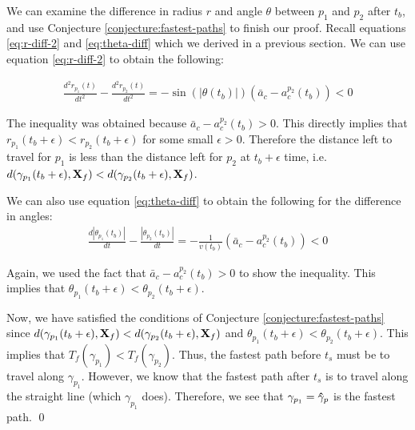 We can examine the difference in radius $r$ and angle $\theta$ between $p_1$ and $p_2$ after $t_b$, and use Conjecture \ref{conjecture:fastest-paths} to finish our proof. Recall equations \ref{eq:r-diff-2} and \ref{eq:theta-diff} which we derived in a previous section. We can use equation \ref{eq:r-diff-2} to obtain the following:

\begin{eqnarray}
  \frac{d^2 r_{p_1}(t)}{d t^2} - \frac{d^2 r_{p_2}(t)}{d t^2} = - \sin(| \theta(t_b) |) \left( \bar{a}_c - a^{p_2}_c(t_b) \right) < 0
\end{eqnarray}

The inequality was obtained because $\bar{a}_c - a^{p_2}_c(t_b) > 0$. This directly implies that $r_{p_1}(t_b + \epsilon) < r_{p_2}(t_b + \epsilon)$ for some small $\epsilon > 0$. Therefore the distance left to travel for $p_1$ is less than the distance left for $p_2$ at $t_b + \epsilon$ time, i.e. $d(\gamma_{p_1}(t_b + \epsilon), \mathbf{X}_f) < d(\gamma_{p_2}(t_b + \epsilon), \mathbf{X}_f)$.

We can also use equation \ref{eq:theta-diff} to obtain the following for the difference in angles:
\begin{eqnarray}
  \frac{d | \theta_{p_1}(t_b) |}{dt} - \frac{ |\theta_{p_2} (t_b) |}{dt} = - \frac{1}{v(t_b)} \left(\bar{a}_c - a^{p_2}_c(t_b) \right) < 0
\end{eqnarray}

Again, we used the fact that $\bar{a}_c - a^{p_2}_c(t_b) > 0$ to show the inequality. This implies that $\theta_{p_1}(t_b + \epsilon) < \theta_{p_2}(t_b + \epsilon)$.

Now, we have satisfied the conditions of Conjecture \ref{conjecture:fastest-paths} since $d(\gamma_{p_1}(t_b + \epsilon), \mathbf{X}_f) < d(\gamma_{p_2}(t_b + \epsilon), \mathbf{X}_f)$ and $\theta_{p_1}(t_b + \epsilon) < \theta_{p_2}(t_b + \epsilon)$. This implies that $T_f(\gamma_{p_1}) < T_f(\gamma_{p_2})$. Thus, the fastest path before $t_s$ must be to travel along $\gamma_{p_1}$. However, we know that the fastest path after $t_s$ is to travel along the straight line (which $\gamma_{p_1}$ does). Therefore, we see that $\gamma_{p_1} = \mathbf{\hat{\gamma}}_p$ is the fastest path.
\qed
